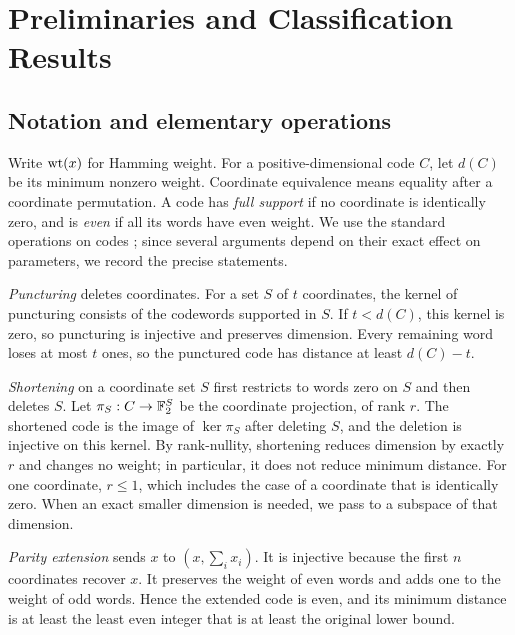 \section{Preliminaries and Classification Results}\label{sec:preliminaries}
\subsection{Notation and elementary operations}
Write $\operatorname{wt}(x)$ for Hamming weight. For a positive-dimensional code $C$, let $d(C)$ be its minimum nonzero weight. Coordinate equivalence means equality after a coordinate permutation. A code has \emph{full support} if no coordinate is identically zero, and is \emph{even} if all its words have even weight. We use the standard operations on codes \citep{macwilliams1977}; since several arguments depend on their exact effect on parameters, we record the precise statements.

\emph{Puncturing} deletes coordinates. For a set $S$ of $t$ coordinates, the kernel of puncturing consists of the codewords supported in $S$. If $t<d(C)$, this kernel is zero, so puncturing is injective and preserves dimension. Every remaining word loses at most $t$ ones, so the punctured code has distance at least $d(C)-t$.

\emph{Shortening} on a coordinate set $S$ first restricts to words zero on $S$ and then deletes $S$. Let $\pi_S:C\to\mathbb F_2^S$ be the coordinate projection, of rank $r$. The shortened code is the image of $\ker\pi_S$ after deleting $S$, and the deletion is injective on this kernel. By rank-nullity, shortening reduces dimension by exactly $r$ and changes no weight; in particular, it does not reduce minimum distance. For one coordinate, $r\le1$, which includes the case of a coordinate that is identically zero. When an exact smaller dimension is needed, we pass to a subspace of that dimension.

\emph{Parity extension} sends $x$ to $(x,\sum_i x_i)$. It is injective because the first $n$ coordinates recover $x$. It preserves the weight of even words and adds one to the weight of odd words. Hence the extended code is even, and its minimum distance is at least the least even integer that is at least the original lower bound.

